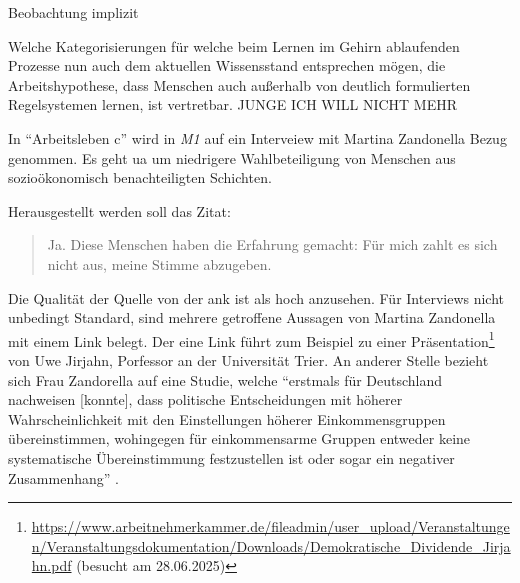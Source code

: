 



Beobachtung \autocite[72-81]{Kiesel2012}
implizit 

Welche Kategorisierungen für welche beim Lernen im Gehirn ablaufenden Prozesse nun auch dem aktuellen Wissensstand entsprechen mögen, die Arbeitshypothese, dass Menschen auch außerhalb von deutlich formulierten Regelsystemen lernen, ist vertretbar. 
JUNGE ICH WILL NICHT MEHR



In \enquote{Arbeitsleben c} wird in \emph{M1} auf ein Interveiew mit Martina Zandonella \autocite{Zandonella.2024} Bezug genommen. Es geht \gls{ua} um niedrigere Wahlbeteiligung von Menschen aus sozioökonomisch benachteiligten Schichten.

Herausgestellt werden soll das Zitat:
\begin{quote}
    Ja. Diese Menschen haben die Erfahrung gemacht: Für mich zahlt es sich nicht aus, meine Stimme abzugeben.   
\end{quote}

Die Qualität der Quelle von der \gls{ank} ist als hoch anzusehen. Für Interviews nicht unbedingt Standard, sind mehrere getroffene Aussagen von Martina Zandonella mit einem Link belegt. Der eine Link führt zum Beispiel zu einer Präsentation\footnote{
    \url{https://www.arbeitnehmerkammer.de/fileadmin/user_upload/Veranstaltungen/Veranstaltungsdokumentation/Downloads/Demokratische_Dividende_Jirjahn.pdf} (besucht am 28.06.2025)
} von Uwe Jirjahn, Porfessor an der Universität Trier. An anderer Stelle bezieht sich Frau Zandorella auf eine Studie, welche 
\enquote{erstmals für Deutschland nachweisen [konnte], dass politische Entscheidungen mit höherer Wahrscheinlichkeit mit den Einstellungen höherer Einkommensgruppen übereinstimmen, wohingegen für einkommensarme Gruppen entweder keine systematische Übereinstimmung festzustellen ist oder sogar ein negativer Zusammenhang} \autocite[177]{Elsasser.2017}.

